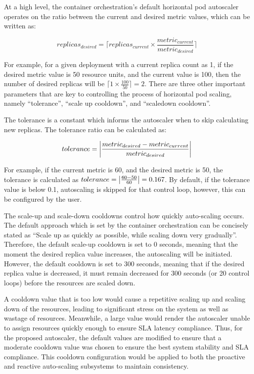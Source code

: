 At a high level, the container orchestration's default horizontal pod autoscaler operates on the ratio between the current and desired metric values, which can be written as:

\begin{equation}
    replicas_{desired} = \lceil replicas_{current} \times \frac{metric_{current}}{metric_{desired}}\rceil
    \label{eqn:replica-desired}
\end{equation}

For example, for a given deployment with a current replica count as 1, if the desired metric value is 50 resource units, and the current value is 100, then the number of desired replicas will be $\lceil 1 \times \frac{100}{50}\rceil = 2$. There are three other important parameters that are key to controlling the process of horizontal pod scaling, namely ``tolerance'', ``scale up cooldown'', and ``scaledown cooldown''.\par

The tolerance is a constant which informs the autoscaler when to skip calculating new replicas. The tolerance ratio can be calculated as:

\begin{equation}
    \label{eqn:tolerance}
    tolerance = \abs{ \frac{metric_{desired} - metric_{current}}{metric_{desired}} }
\end{equation}

For example, if the current metric is 60, and the desired metric is 50, the tolerance is calculated as $ tolerance = \abs{ \frac{60 - 50}{60}} = 0.167$. By default, if the tolerance value is below 0.1, autoscaling is skipped for that control loop, however, this can be configured by the user.\par

The scale-up and scale-down cooldowns control how quickly auto-scaling occurs. The default approach which is set by the container orchestration can be concisely stated as ``Scale up as quickly as possible, while scaling down very gradually''. Therefore, the default scale-up cooldown is set to 0 seconds, meaning that the moment the desired replica value increases, the autoscaling will be initiated. However, the default cooldown is set to 300 seconds, meaning that if the desired replica value is decreased, it must remain decreased for 300 seconds (or 20 control loops) before the resources are scaled down.\par

A cooldown value that is too low would cause a repetitive scaling up and scaling down of the resources, leading to significant stress on the system as well as wastage of resources. Meanwhile, a large value would render the autoscaler unable to assign resources quickly enough to ensure SLA latency compliance. Thus, for the proposed autoscaler, the default values are modified to ensure that a moderate cooldown value was chosen to ensure the best system stability and SLA compliance. This cooldown configuration would be applied to both the proactive and reactive auto-scaling subsystems to maintain consistency.\par

